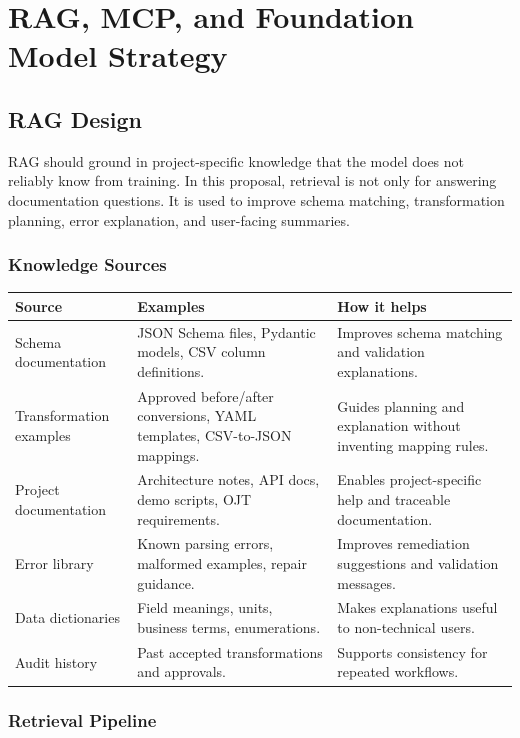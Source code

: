 \section{RAG, MCP, and Foundation Model Strategy}

\subsection{RAG Design}

RAG should ground \projectname{} in project-specific knowledge that the model does not reliably know from training. In this proposal, retrieval is not only for answering documentation questions. It is used to improve schema matching, transformation planning, error explanation, and user-facing summaries.

\subsubsection{Knowledge Sources}

\begin{tabularx}{\textwidth}{p{}X X}
\toprule
\textbf{Source} & \textbf{Examples} & \textbf{How it helps} \\
\midrule
Schema documentation & JSON Schema files, Pydantic models, CSV column definitions. & Improves schema matching and validation explanations. \\
Transformation examples & Approved before/after conversions, YAML templates, CSV-to-JSON mappings. & Guides planning and explanation without inventing mapping rules. \\
Project documentation & Architecture notes, API docs, demo scripts, OJT requirements. & Enables project-specific help and traceable documentation. \\
Error library & Known parsing errors, malformed examples, repair guidance. & Improves remediation suggestions and validation messages. \\
Data dictionaries & Field meanings, units, business terms, enumerations. & Makes explanations useful to non-technical users. \\
Audit history & Past accepted transformations and approvals. & Supports consistency for repeated workflows. \\
\bottomrule
\end{tabularx}

\subsubsection{Retrieval Pipeline}


